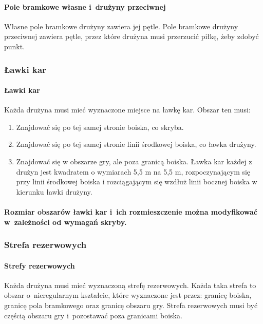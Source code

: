 \documentclass[12pt,a4paper]{article}
\begin{document}
\paragraph{Pole bramkowe własne i~drużyny przeciwnej}
Własne pole bramkowe drużyny zawiera jej pętle. Pole bramkowe drużyny
przeciwnej zawiera pętle, przez które drużyna musi przerzucić piłkę,
żeby zdobyć punkt.

\subsubsection{Ławki kar}

\paragraph{Ławki kar}
Każda drużyna musi mieć wyznaczone miejsce
na ławkę kar. Obszar ten musi:
\begin{enumerate}
	\item Znajdować się po tej samej stronie boiska, co skryba.

	\item Znajdować się po tej samej stronie linii środkowej boiska, co ławka
	      drużyny.

	\item Znajdować się w obszarze gry, ale poza granicą boiska. Ławka kar każdej z drużyn jest kwadratem o wymiarach 5,5 m na 5,5 m, rozpoczynającym się przy linii środkowej boiska i rozciągającym się wzdłuż linii bocznej boiska w kierunku ławki drużyny.
\end{enumerate}

\paragraph{Rozmiar obszarów ławki kar i~ich rozmieszczenie można
	modyfikować w~zależności od wymagań skryby.}

\subsubsection{Strefa rezerwowych}

\paragraph{Strefy rezerwowych}
Każda drużyna musi mieć
wyznaczoną strefę rezerwowych. Każda taka strefa to obszar o~nieregularnym kształcie, które wyznaczone jest przez: granicę boiska,
granicę pola bramkowego oraz granicę obszaru gry. Strefa rezerwowych
musi być częścią obszaru gry i~pozostawać poza granicami boiska.
\end{document}
